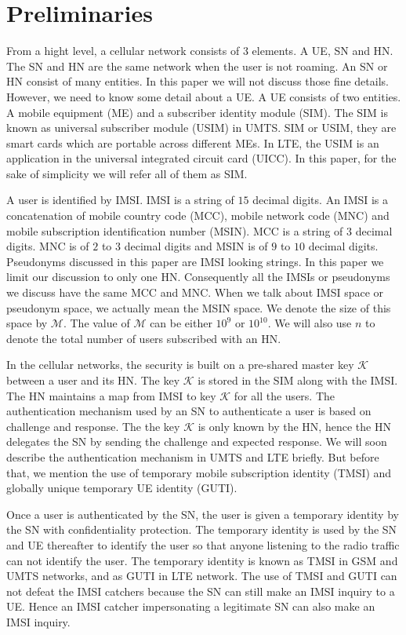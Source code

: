 \documentclass{llncs} %
\begin{document}
\section{Preliminaries}
From a hight level, a cellular network consists of $3$ elements. A UE, SN and HN. The SN and HN are the same network when the user is not roaming. An SN or HN consist of many entities. In this paper we will not discuss those fine details. However, we need to know some detail about a UE. A UE consists of two entities. A mobile equipment (ME) and a subscriber identity module (SIM). The SIM is known as universal subscriber module (USIM) in UMTS. SIM or USIM, they are smart cards which are portable across different MEs. In LTE, the USIM is an application in the universal integrated circuit card (UICC). In this paper, for the sake of simplicity we will refer all of them as SIM.


A user is identified by IMSI. IMSI is a string of $15$ decimal digits. An IMSI is a concatenation of mobile country code (MCC), mobile network code (MNC) and mobile subscription identification number (MSIN). MCC is a string of $3$ decimal digits. MNC is of $2$ to $3$ decimal digits and MSIN is of $9$ to $10$ decimal digits. Pseudonyms discussed in this paper are IMSI looking strings. In this paper we limit our discussion to only one HN. Consequently all the IMSIs or pseudonyms we discuss have the same MCC and MNC. When we talk about IMSI space or pseudonym space, we actually mean the MSIN space. We denote the size of this space by $\mathcal{M}$. The value of $\mathcal{M}$ can be either $10^9$ or $10^{10}$. We will also use $n$ to denote the total number of users subscribed with an HN.

In the cellular networks, the security is built on a pre-shared master key $\mathcal{K}$ between a user and its HN. The key $\mathcal{K}$ is stored in the SIM along with the IMSI. The HN maintains a map from IMSI to key $\mathcal{K}$ for all the users. The authentication mechanism used by an SN to authenticate a user is based on challenge and response. The the key $\mathcal{K}$ is only known by the HN, hence the HN delegates the SN by sending the challenge and expected response. We will soon describe the authentication mechanism in UMTS and LTE briefly. But before that, we mention the use of temporary mobile subscription identity (TMSI) and globally unique temporary UE identity (GUTI).

Once a user is authenticated by the SN, the user is given a temporary identity by the SN with confidentiality protection. The temporary identity is used by the SN and UE thereafter to identify the user so that anyone listening to the radio traffic can not identify the user. The temporary identity is known as TMSI in GSM and UMTS networks, and as GUTI in LTE network. The use of TMSI and GUTI can not defeat the IMSI catchers because the SN can still make an IMSI inquiry to a UE. Hence an IMSI catcher impersonating a legitimate SN can also make an IMSI inquiry. 
\end{document}
